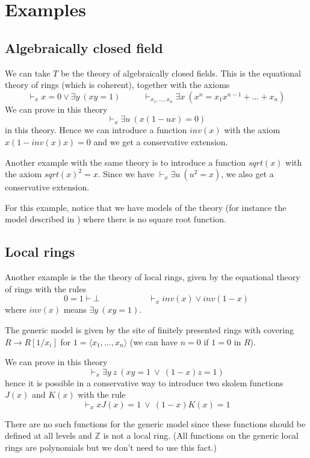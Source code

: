 \documentclass[10pt,a4paper]{article}
\newcommand{\ideal}[1]{\langle #1\rangle}
\newcommand{\ints}{\mathbb{Z}}
\begin{document}
\section{Examples}

\subsection{Algebraically closed field}

We can take $T$ be the theory of algebraically closed fields. 
This is the equational theory of rings (which is coherent), together with the axioms
$$
\vdash_x x = 0 \vee \exists y~(xy = 1)~~~~~~~~~~~~
\vdash_{x_1,\dots,x_n} \exists x~(x^n = x_1 x^{n-1} + \dots + x_n)
$$
We can prove in this theory
$$
\vdash_{x} \exists u~ (x(1-ux) = 0)
$$
in this theory. Hence we can introduce a function $inv(x)$ with the axiom
$x(1 -inv(x) x) = 0$ and we get a conservative extension. 

 Another example with the same theory is to introduce a function $sqrt(x)$ with the axiom
$sqrt(x)^2 = x$. Since we have $\vdash_{x} \exists u~(u^2 = x)$, we also get a conservative
extension.

 For this example, notice that we have models of the theory (for instance the model described
in \cite{Mannaa}) where there is no square root function.

\subsection{Local rings}

 Another example is the the theory of local rings, given by the equational theory of rings
with the rules
$$
0=1\vdash\bot~~~~~~~~~~~~~~~~~~~~~~~~~~\vdash_x inv(x)\vee inv(1-x)
$$
where $inv(x)$ means $\exists y~(xy = 1)$. 

 The generic model is given by the site of finitely presented rings with covering
$R\rightarrow R[1/x_i]$ for $1 = \ideal{x_1,\dots,x_n}$ (we can have $n = 0$ if $1=0$ in $R$).

 We can prove in this theory
$$
\vdash_x \exists y~z~(x y = 1~\vee ~(1-x) z = 1)
$$
hence it is possible in a conservative way
to introduce two skolem functions $J(x)$ and $K(x)$ with the rule
$$
\vdash_x xJ(x) = 1~\vee~(1-x)K(x) = 1
$$

 There are no such functions for the generic model since these functions should be defined
at all levels and $\ints$ is not a local ring.
(All functions on the generic local rings are polynomials but we don't need to use this fact.)
\end{document}
